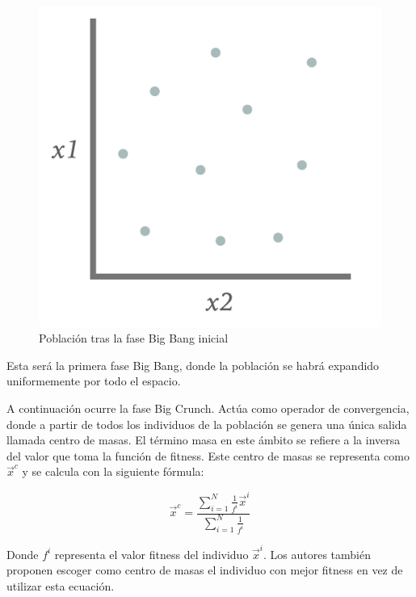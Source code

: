 \begin{figure}[H]
    \centering
        \includegraphics[scale=0.23]{img/initial_big_bang.png}
        \caption{Población tras la fase Big Bang inicial}
\end{figure}

Esta será la primera fase Big Bang, donde la población se habrá expandido uniformemente por todo el espacio.

A continuación ocurre la fase Big Crunch. Actúa como operador de convergencia, donde a partir de todos los individuos de la población se genera una única salida llamada centro de masas. El término masa en este ámbito se refiere a la inversa del valor que toma la función de fitness. Este centro de masas se representa como $\vec{x}^c$ y se calcula con la siguiente fórmula:

\begin{equation}
    \vec{x}^c = \frac{\sum^{N}_{i=1}\frac{1}{f^i}\vec{x}^i}{\sum^{N}_{i=1}\frac{1}{f^i}}
\end{equation}

Donde $f^i$ representa el valor fitness del individuo $\vec{x}^i$. Los autores también proponen escoger como centro de masas el individuo con mejor fitness en vez de utilizar esta ecuación.

